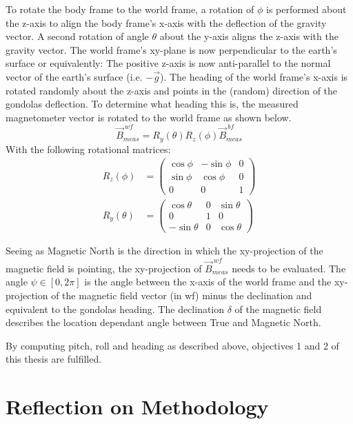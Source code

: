 To rotate the body frame to the world frame, a rotation of $\phi$ is performed about the z-axis to align the body frame's x-axis with the deflection of the gravity vector. A second rotation of angle $\theta$ about the y-axis aligns the z-axis with the gravity vector. The world frame's xy-plane is now perpendicular to the earth's surface or equivalently: The positive z-axis is now anti-parallel to the normal vector of the earth's surface (i.e. $-\vec{g}$). The heading of the world frame's x-axis is rotated randomly about the z-axis and points in the (random) direction of the gondolas deflection. To determine what heading this is, the measured magnetometer vector is rotated to the world frame as shown below.
\begin{equation}
    \vec{B}_{meas}^{\ wf}=R_y(\theta)R_z(\phi)\vec{B}_{meas}^{\ bf}
\end{equation}
With the following rotational matrices:
\begin{align}
    R_z(\phi)&=\begin{pmatrix}
                \cos\phi & -\sin\phi & 0 \\
                \sin\phi & \cos\phi & 0 \\
                0 & 0 & 1
                \end{pmatrix} \\
    R_y(\theta)&=\begin{pmatrix}
                \cos\theta & 0 & \sin\theta \\
                0 & 1 & 0 \\
                -\sin\theta & 0 & \cos\theta
                \end{pmatrix}
\end{align}

Seeing as Magnetic North is the direction in which the xy-projection of the magnetic field is pointing, the xy-projection of $\vec{B}_{meas}^{\ wf}$ needs to be evaluated. The angle $\psi\in[0,2\pi]$ is the angle between the x-axis of the world frame and the xy-projection of the magnetic field vector (in wf) minus the declination and equivalent to the gondolas heading. The declination $\delta$ of the magnetic field describes the location dependant angle between True and Magnetic North.

By computing pitch, roll and heading as described above, objectives 1 and 2 of this thesis are fulfilled.

\section{Reflection on Methodology \label{sec:meth:reflection_methodology}}